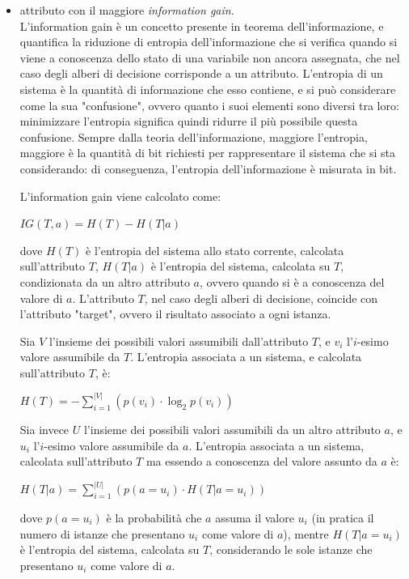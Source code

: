 \begin{itemize}
    \item attributo con il maggiore \textit{information gain}.\\
    L'information gain è un concetto presente in teorema dell'informazione,
    e quantifica la riduzione di entropia dell'informazione che si verifica
    quando si viene a conoscenza dello stato di una variabile non ancora
    assegnata, che nel caso degli alberi di decisione corrisponde a un
    attributo.
    L'entropia di un sistema è la quantità di informazione che esso contiene, e
    si può considerare come la sua "confusione", ovvero quanto i suoi elementi
    sono diversi tra loro: minimizzare l'entropia significa quindi ridurre il
    più possibile questa confusione.
    Sempre dalla teoria dell'informazione, maggiore l'entropia, maggiore è la
    quantità di bit richiesti per rappresentare il sistema che si sta
    considerando: di conseguenza, l'entropia dell'informazione è misurata in
    bit.
    
    L'information gain viene calcolato come:
    \begin{center}
        $IG(T, a) = H(T) - H(T | a)$
    \end{center}
    dove $H(T)$ è l'entropia del sistema allo stato corrente, calcolata
    sull'attributo $T$, $H(T | a)$ è l'entropia del sistema, calcolata su $T$,
    condizionata da un altro attributo $a$, ovvero quando si è a conoscenza del valore di $a$.
    L'attributo $T$, nel caso degli alberi di decisione, coincide con
    l'attributo "target", ovvero il risultato associato a ogni istanza.
    
    Sia $V$ l'insieme dei possibili valori assumibili dall'attributo $T$,
    e $v_i$ l'$i$-esimo valore assumibile da $T$. L'entropia associata a un
    sistema, e calcolata sull'attributo $T$, è:
    \begin{center}
        $H(T) =
        -\sum\limits_{i = 1}^{|V|} \left( p(v_i) \cdot \log_2 p(v_i) \right)$
    \end{center}
    Sia invece $U$ l'insieme dei possibili valori assumibili da un altro
    attributo $a$, e $u_i$ l'$i$-esimo valore assumibile da $a$.
    L'entropia associata a un sistema, calcolata sull'attributo $T$ ma essendo a
    conoscenza del valore assunto da $a$ è:
    \begin{center}
        $H(T | a) =
        \sum\limits_{i = 1}^{|U|} \left( p(a = u_i) \cdot H(T | a=u_i) \right) $
    \end{center}
    dove $p(a = u_i)$ è la probabilità che $a$ assuma il valore $u_i$ (in
    pratica il numero di istanze che presentano $u_i$ come valore di $a$),
    mentre $H(T | a = u_i)$ è l'entropia del sistema, calcolata su $T$,
    considerando le sole istanze che presentano $u_i$ come valore di $a$.
    

\end{itemize}
